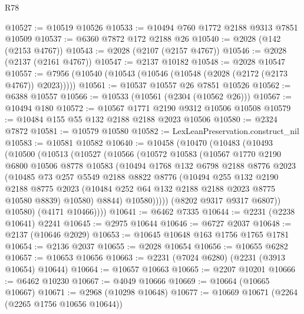 \begin{lexlean}{R78}
\begin{coremodule}
@10527 := @10519 @10526
@10533 := @10494 @760 @1772 @2188 @9313 @7851 @10509
@10537 := @6360 @7872 @172 @2188 @26
@10540 := @2028 (@142 (@2153 @4767))
@10543 := @2028 (@2107 (@2157 @4767))
@10546 := @2028 (@2137 (@2161 @4767))
@10547 := @2137 @10182
@10548 := @2028 @10547
@10557 := @7956 (@10540 (@10543 (@10546 (@10548 (@2028 (@2172 (@2173 @4767)) @2023)))))
@10561 := @10537 @10557 @26 @7851 @10526
@10562 := @6388 @10557
@10566 := @10533 (@10561 (@2304 (@10562 @26)))
@10567 := @10494 @180
@10572 := @10567 @1771 @2190 @9312 @10506 @10508
@10579 := @10484 @155 @55 @132 @2188 @2188 @2023 @10506
@10580 := @2324 @7872
@10581 := @10579 @10580
@10582 := LexLeanPreservation.construct_nil
@10583 := @10581 @10582
@10640 := @10458
    (@10470
      (@10483
        (@10493
          (@10500
            (@10513
              (@10527
                (@10566
                  (@10572
                    @10583
                    (@10567
                      @1770
                      @2190
                      @6800
                      @10506
                      @8778
                      @10583
                      (@10494
                        @1768
                        @132
                        @6798
                        @2188
                        @8776
                        @2023
                        (@10485
                          @73
                          @257
                          @5549
                          @2188
                          @8822
                          @8776
                          (@10494
                            @255
                            @132
                            @2190
                            @2188
                            @8775
                            @2023
                            (@10484 @252 @64 @132 @2188 @2188 @2023 @8775 @10580 @8839)
                            @10580)
                          @8844)
                        @10580)))))
              (@8202 @9317 @9317 @6807))
            @10580)
          (@4171 @10466))))
@10641 := @6462 @7335
@10644 := @2231 (@2238 @10641) @2241
@10645 := @2975 @10644
@10646 := @6727 @2037
@10648 := @2137 (@10646 @2029)
@10653 := @10645 @10648 @163 @1756 @1765 @1781
@10654 := @2136 @2037
@10655 := @2028 @10654
@10656 := @10655 @6282
@10657 := @10653 @10656
@10663 := @2231 (@7024 @6280) (@2231 (@3913 @10654) @10644)
@10664 := @10657 @10663
@10665 := @2207 @10201
@10666 := @6462 @10230
@10667 := @4049 @10666
@10669 := @10664 (@10665 @10667)
@10671 := @2968 (@10298 @10648)
@10677 := @10669 @10671 (@2264 (@2265 @1756 @10656 @10644))

\end{coremodule}
\end{lexlean}
